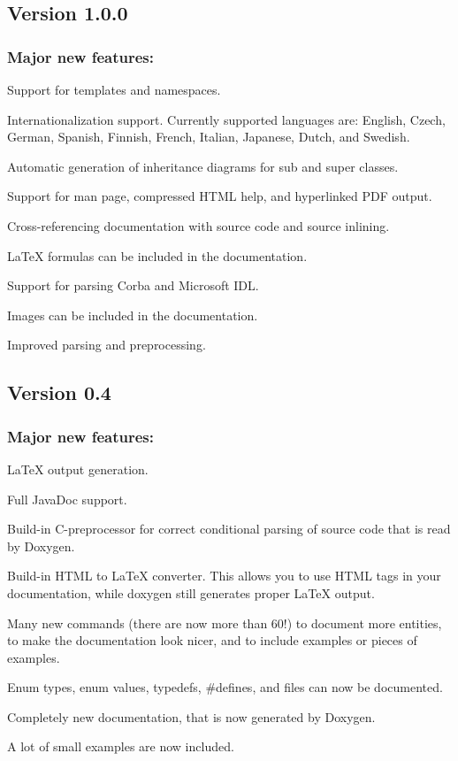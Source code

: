 \subsection*{Version 1.0.0}

\subsubsection*{Major new features:}


\begin{DoxyItemize}
\item Support for templates and namespaces. 
\item Internationalization support. Currently supported languages are: English, Czech, German, Spanish, Finnish, French, Italian, Japanese, Dutch, and Swedish. 
\item Automatic generation of inheritance diagrams for sub and super classes. 
\item Support for man page, compressed HTML help, and hyperlinked PDF output. 
\item Cross-\/referencing documentation with source code and source inlining. 
\item LaTeX formulas can be included in the documentation. 
\item Support for parsing Corba and Microsoft IDL. 
\item Images can be included in the documentation. 
\item Improved parsing and preprocessing. 
\end{DoxyItemize}

\subsection*{Version 0.4}

\subsubsection*{Major new features:}


\begin{DoxyItemize}
\item LaTeX output generation. 
\item Full JavaDoc support. 
\item Build-\/in C-\/preprocessor for correct conditional parsing of source code that is read by Doxygen. 
\item Build-\/in HTML to LaTeX converter. This allows you to use HTML tags in your documentation, while doxygen still generates proper LaTeX output. 
\item Many new commands (there are now more than 60!) to document more entities, to make the documentation look nicer, and to include examples or pieces of examples. 
\item Enum types, enum values, typedefs, \#defines, and files can now be documented. 
\item Completely new documentation, that is now generated by Doxygen. 
\item A lot of small examples are now included. 
\end{DoxyItemize}

